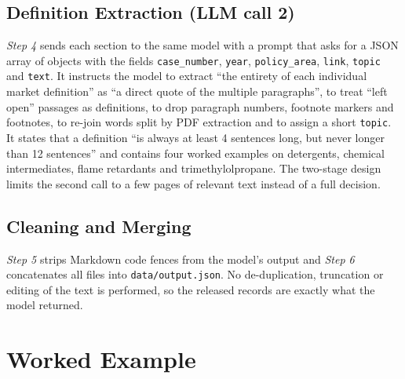 \documentclass{IOS-Book-Article}
\begin{document}
\subsection{Definition Extraction (LLM call 2)}

\emph{Step 4} sends each section to the same model with a prompt that asks for a
JSON array of objects with the fields \texttt{case\_number}, \texttt{year},
\texttt{policy\_area}, \texttt{link}, \texttt{topic} and \texttt{text}. It
instructs the model to extract ``the entirety of each individual market
definition'' as ``a direct quote of the multiple paragraphs'', to treat ``left
open'' passages as definitions, to drop paragraph numbers, footnote markers and
footnotes, to re-join words split by PDF extraction and to assign a short
\texttt{topic}. It states that a definition ``is always at least 4 sentences
long, but never longer than 12 sentences'' and contains four worked examples on
detergents, chemical intermediates, flame retardants and trimethylolpropane.
The two-stage design limits the second call to a few pages of relevant text
instead of a full decision.

\subsection{Cleaning and Merging}

\emph{Step 5} strips Markdown code fences from the model's output and
\emph{Step 6} concatenates all files into \texttt{data/output.json}. No
de-duplication, truncation or editing of the text is performed, so the released
records are exactly what the model returned.

\section{Worked Example}
\label{sec:example}
\end{document}
